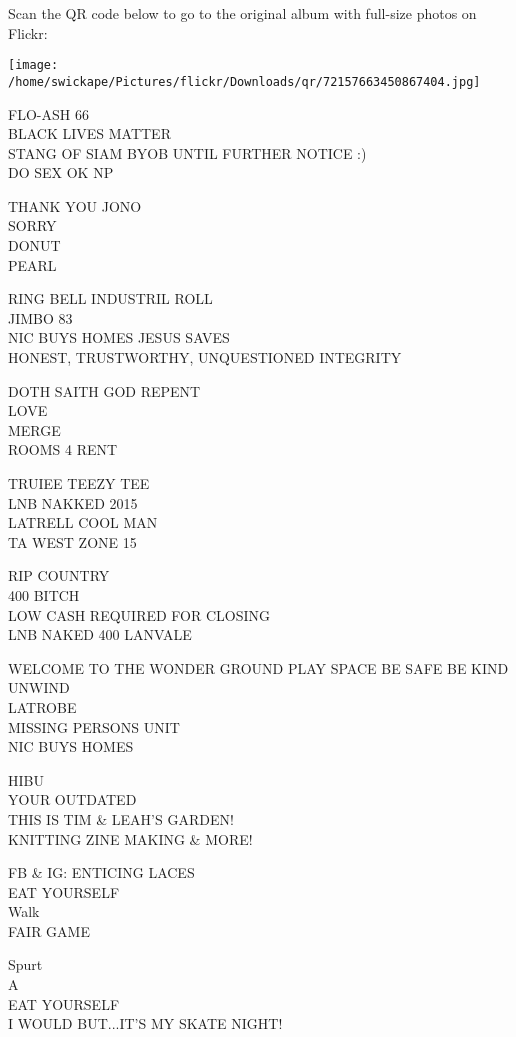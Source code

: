 \documentclass[10pt,letterpaper]{article}
\begin{document}
Scan the QR code below to go to the original album with full-size photos on Flickr:

\texttt{[image: /home/swickape/Pictures/flickr/Downloads/qr/72157663450867404.jpg]}


FLO{-}ASH 66\\
BLACK LIVES MATTER\\
STANG OF SIAM BYOB UNTIL FURTHER NOTICE :)\\
DO SEX OK NP

THANK YOU JONO\\
SORRY\\
DONUT\\
PEARL

RING BELL INDUSTRIL ROLL\\
JIMBO 83\\
NIC BUYS HOMES JESUS SAVES\\
HONEST, TRUSTWORTHY, UNQUESTIONED INTEGRITY

DOTH SAITH GOD REPENT\\
LOVE\\
MERGE\\
ROOMS 4 RENT

TRUIEE TEEZY TEE\\
LNB NAKKED 2015\\
LATRELL COOL MAN\\
TA WEST ZONE 15

RIP COUNTRY\\
400 BITCH\\
LOW CASH REQUIRED FOR CLOSING\\
LNB NAKED 400 LANVALE

WELCOME TO THE WONDER GROUND PLAY SPACE BE SAFE BE KIND UNWIND\\
LATROBE\\
MISSING PERSONS UNIT\\
NIC BUYS HOMES

HIBU\\
YOUR OUTDATED\\
THIS IS TIM \& LEAH'S GARDEN!\\
KNITTING ZINE MAKING \& MORE!

FB \& IG: ENTICING LACES\\
EAT YOURSELF\\
Walk\\
FAIR GAME

Spurt\\
A\\
EAT YOURSELF\\
I WOULD BUT...IT'S MY SKATE NIGHT!
\end{document}

